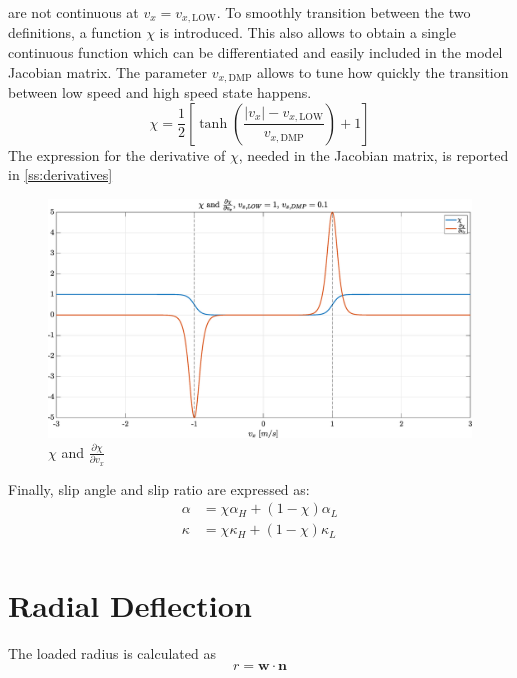 are not continuous at $v_x = v_{x,\text{LOW}}$. To smoothly transition between the two definitions, a function $\chi$ is introduced. This also allows to obtain a single continuous function which can be differentiated and easily included in the model Jacobian matrix. The parameter $v_{x, \text{DMP}}$ allows to tune how quickly the transition between low speed and high speed state happens.
\begin{equation}
    \chi = \frac{1}{2}\left[\tanh\left(\frac{|v_x| - v_{x, \text{LOW}}}{v_{x, \text{DMP}}}\right) + 1\right]
\end{equation}
The expression for the derivative of $\chi$, needed in the Jacobian matrix, is reported in \ref{ss:derivatives}
\begin{figure}
    \centering
    \includegraphics[width=1\textwidth]{MFtirePlots/transition.eps}
    \caption{$\chi$ and $\frac{\partial{\chi}}{\partial{v_x}}$}
\end{figure}
Finally, slip angle and slip ratio are expressed as:
\begin{equation}
    \begin{split}
        \alpha &= \chi \alpha_H + (1-\chi) \alpha_L\\
        \kappa &= \chi \kappa_H + (1-\chi) \kappa_L\\
    \end{split}
\end{equation}

\section{Radial Deflection}

The loaded radius is calculated as 
\begin{equation}
    r = \mathbf{w} \cdot \mathbf{n}
\end{equation}

